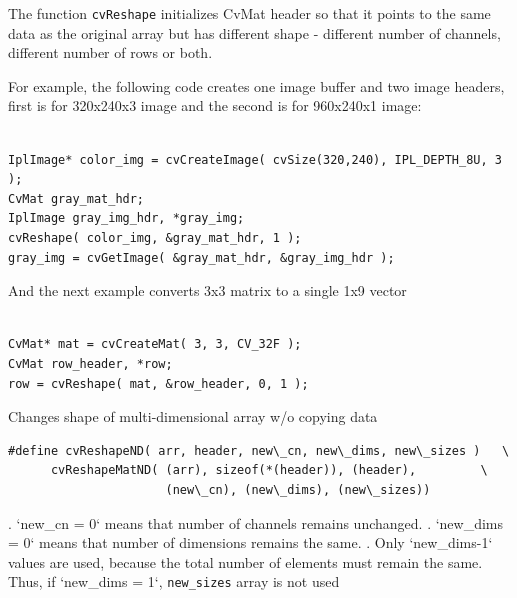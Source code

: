 The function \texttt{cvReshape} initializes CvMat header so that it points to the same data as the original array but has different shape - different number of channels, different number of rows or both.

For example, the following code creates one image buffer and two image headers, first is for 320x240x3 image and the second is for 960x240x1 image:

\begin{lstlisting}

IplImage* color_img = cvCreateImage( cvSize(320,240), IPL_DEPTH_8U, 3 );
CvMat gray_mat_hdr;
IplImage gray_img_hdr, *gray_img;
cvReshape( color_img, &gray_mat_hdr, 1 );
gray_img = cvGetImage( &gray_mat_hdr, &gray_img_hdr );

\end{lstlisting}

And the next example converts 3x3 matrix to a single 1x9 vector

\begin{lstlisting}

CvMat* mat = cvCreateMat( 3, 3, CV_32F );
CvMat row_header, *row;
row = cvReshape( mat, &row_header, 0, 1 );

\end{lstlisting}

\label{ReshapeMatND}

Changes shape of multi-dimensional array w/o copying data


\begin{lstlisting}
#define cvReshapeND( arr, header, new\_cn, new\_dims, new\_sizes )   \
      cvReshapeMatND( (arr), sizeof(*(header)), (header),         \
                      (new\_cn), (new\_dims), (new\_sizes))
\end{lstlisting}


\begin{description}
\cvarg{new\_cn}{New number of channels}
. `new\_cn = 0` means that number of channels remains unchanged.
. `new\_dims = 0` means that number of dimensions remains the same.
. Only `new\_dims-1` values are used, because the total number of elements must remain the same. Thus, if `new\_dims = 1`, \texttt{new\_sizes} array is not used
\end{description}

